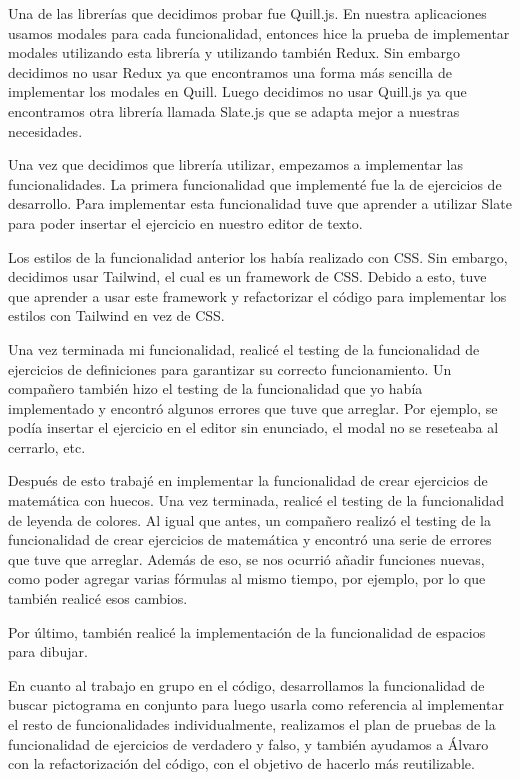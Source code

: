 Una de las librerías que decidimos probar fue Quill.js. En nuestra aplicaciones usamos modales para cada funcionalidad, entonces hice la prueba de implementar modales utilizando esta librería y utilizando también Redux. Sin embargo decidimos no usar Redux ya que encontramos una forma más sencilla de implementar los modales en Quill. Luego decidimos no usar Quill.js ya que encontramos otra librería llamada Slate.js que se adapta mejor a nuestras necesidades.

Una vez que decidimos que librería utilizar, empezamos a implementar las funcionalidades. La primera funcionalidad que implementé fue la de ejercicios de desarrollo. Para implementar esta funcionalidad tuve que aprender a utilizar Slate para poder insertar el ejercicio en nuestro editor de texto.

Los estilos de la funcionalidad anterior los había realizado con CSS. Sin embargo, decidimos usar Tailwind, el cual es un framework de CSS. Debido a esto, tuve que aprender a usar este framework y refactorizar el código para implementar los estilos con Tailwind en vez de CSS.

Una vez terminada mi funcionalidad, realicé el testing de la funcionalidad de ejercicios de definiciones para garantizar su correcto funcionamiento. Un compañero también hizo el testing de la funcionalidad que yo había implementado y encontró algunos errores que tuve que arreglar. Por ejemplo, se podía insertar el ejercicio en el editor sin enunciado, el modal no se reseteaba al cerrarlo, etc.

Después de esto trabajé en implementar la funcionalidad de crear ejercicios de matemática con huecos. Una vez terminada, realicé el testing de la funcionalidad de leyenda de colores. Al igual que antes, un compañero realizó el testing de la funcionalidad de crear ejercicios de matemática y encontró una serie de errores que tuve que arreglar. Además de eso, se nos ocurrió añadir funciones nuevas, como poder agregar varias fórmulas al mismo tiempo, por ejemplo, por lo que también realicé esos cambios.

Por último, también realicé la implementación de la funcionalidad de espacios para dibujar.

En cuanto al trabajo en grupo en el código, desarrollamos la funcionalidad de buscar pictograma en conjunto para luego usarla como referencia al implementar el resto de funcionalidades individualmente, realizamos el plan de pruebas de la funcionalidad de ejercicios de verdadero y falso, y también ayudamos a Álvaro con la refactorización del código, con el objetivo de hacerlo más reutilizable.

